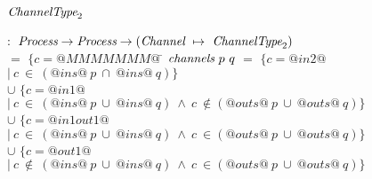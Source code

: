 \begin{figure*}

\begin{tabbing}
$\textit{ChannelType}_2$   \TABDEF \kill

 \> $:$ \> $\textit{Process} \to \textit{Process} \to (\textit{Channel} ~\mapsto~ \textit{ChannelType}_2)$ \\

  \> $=$    \> $\{ c=@MMMMMMM@~$\= \kill
$\textit{channels}~p~q$
  \> $=$    \> $\{ c=@in2@$
            \> $|~c~\in~(@ins@~p~\cap~@ins@~q) \}$ 
            \\

  \> $\cup$ \> $\{ c=@in1@$
            \> $ |~c~\in~(@ins@~p~\cup~@ins@~q)~\wedge~c~\not\in(@outs@~p~\cup~@outs@~q) \}$ \\

  \> $\cup$ \> $\{ c=@in1out1@$
            \> $|~c~\in~(@ins@~p~\cup~@ins@~q)~\wedge~c~\in(@outs@~p~\cup~@outs@~q) \}$ \\

  \> $\cup$ \> $\{ c=@out1@$
            \> $ |~c~\not\in~(@ins@~p~\cup~@ins@~q)~\wedge~c~\in(@outs@~p~\cup~@outs@~q) \}$ 
\end{tabbing}

\newcommand\funClauseDef[3]
{ $\ti{#1}~(#2)$ \> $=$ \> $#3$
}
\newcommand\outlabelsDef[2]
{ \funClauseDef{outlabels}{#1}{\sgl{#2}} 
}


\end{figure*}
